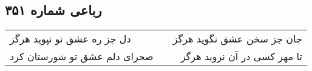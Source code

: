 \begin{center}
\section*{رباعی شماره ۳۵۱}
\label{sec:sh351}
\begin{longtable}{l p{0.5cm} r}
دل جز ره عشق تو نپوید هرگز
&&
جان جز سخن عشق نگوید هرگز
\\
صحرای دلم عشق تو شورستان کرد
&&
تا مهر کسی در آن نروید هرگز
\\
\end{longtable}
\end{center}
